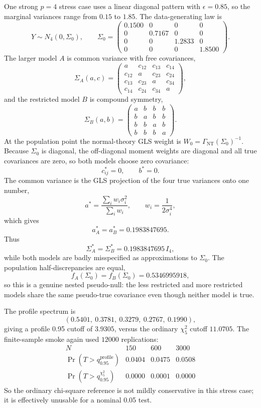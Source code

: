 \documentclass[11pt]{article}
\begin{document}
One strong $p=4$ stress case uses a linear diagonal pattern with
\(\epsilon=0.85\), so the marginal variances range from \(0.15\) to \(1.85\).
The data-generating law is
\[
  Y\sim N_4(0,\Sigma_0),\qquad
  \Sigma_0=
  \begin{pmatrix}
  0.1500 & 0 & 0 & 0\\
  0 & 0.7167 & 0 & 0\\
  0 & 0 & 1.2833 & 0\\
  0 & 0 & 0 & 1.8500
  \end{pmatrix}.
\]
The larger model \(A\) is common variance with free covariances,
\[
  \Sigma_A(a,c)=
  \begin{pmatrix}
  a & c_{12} & c_{13} & c_{14}\\
  c_{12} & a & c_{23} & c_{24}\\
  c_{13} & c_{23} & a & c_{34}\\
  c_{14} & c_{24} & c_{34} & a
  \end{pmatrix},
\]
and the restricted model \(B\) is compound symmetry,
\[
  \Sigma_B(a,b)=
  \begin{pmatrix}
  a & b & b & b\\
  b & a & b & b\\
  b & b & a & b\\
  b & b & b & a
  \end{pmatrix}.
\]
At the population point the normal-theory GLS weight is
\(W_0=\Gamma_{\mathrm{NT}}(\Sigma_0)^{-1}\). Because \(\Sigma_0\) is diagonal,
the off-diagonal moment weights are diagonal and all true covariances are zero,
so both models choose zero covariance:
\[
  c_{ij}^{*}=0,\qquad b^{*}=0.
\]
The common variance is the GLS projection of the four true variances onto one
number,
\[
  a^{*}=
  \frac{\sum_i w_i\sigma_i^2}{\sum_i w_i},\qquad
  w_i=\frac{1}{2\sigma_i^4},
\]
which gives
\[
  a_A^{*}=a_B^{*}=0.1983847695.
\]
Thus
\[
  \Sigma_A^{*}=\Sigma_B^{*}=0.1983847695\,I_4,
\]
while both models are badly misspecified as approximations to \(\Sigma_0\).
The population half-discrepancies are equal,
\[
  f_A(\Sigma_0)=f_B(\Sigma_0)=0.5346995918,
\]
so this is a genuine nested pseudo-null: the less restricted and more
restricted models share the same pseudo-true covariance even though neither
model is true.

The profile spectrum is
\[
  (0.5401,\ 0.3781,\ 0.3279,\ 0.2767,\ 0.1990),
\]
giving a profile 0.95 cutoff of \(3.9305\), versus the ordinary
\(\chi^2_5\) cutoff \(11.0705\). The finite-sample smoke again used \(12000\)
replications:
\[
\begin{array}{c|ccc}
N & 150 & 600 & 3000\\
\hline
\Pr(T>q_{0.95}^{\mathrm{profile}}) & 0.0404 & 0.0475 & 0.0508\\
\Pr(T>q_{0.95}^{\chi^2_5}) & 0.0000 & 0.0001 & 0.0000
\end{array}
\]
So the ordinary chi-square reference is not mildly conservative in this stress
case; it is effectively unusable for a nominal 0.05 test.
\end{document}
